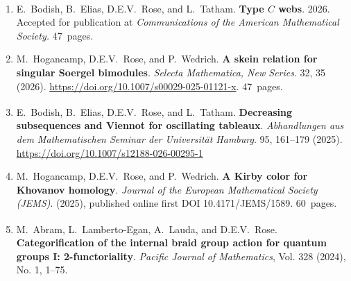 \documentclass[10pt]{article}
\begin{document}
\begin{enumerate}

\item 
E.~Bodish\textsuperscript{\textdagger}, B.~Elias, D.E.V.~Rose, and L.~Tatham\textsuperscript{\textdagger}.
{\bf Type $C$ webs}.
2026.
Accepted for publication at 
\emph{Communications of the American Mathematical Society.}
47~pages.

\item
M.~Hogancamp, D.E.V.~Rose, and P.~Wedrich.
{\bf A skein relation for singular Soergel bimodules}.
\emph{Selecta Mathematica, New Series}.
32, 35 (2026). 
\href{https://doi.org/10.1007/s00029-025-01121-x}{https://doi.org/10.1007/s00029-025-01121-x}.
47~pages.

\item
E.~Bodish\textsuperscript{\textdagger}, B.~Elias, D.E.V.~Rose, and L.~Tatham.
{\bf Decreasing subsequences and Viennot for oscillating tableaux}.
\emph{Abhandlungen aus dem Mathematischen Seminar der Universit\"{a}t Hamburg}.
95, 161–179 (2025).
\href{https://doi.org/10.1007/s12188-026-00295-1}
{https://doi.org/10.1007/s12188-026-00295-1}

\item 
M.~Hogancamp, D.E.V.~Rose, and P.~Wedrich.
{\bf A Kirby color for Khovanov homology}.
\emph{Journal of the European Mathematical Society (JEMS)}.
(2025), published online first DOI 10.4171/JEMS/1589.
60~pages.

\item 
M.~Abram\textsuperscript{\textdagger}, L.~Lamberto-Egan\textsuperscript{\textdagger}, 
A.~Lauda, and D.E.V.~Rose.
{\bf Categorification of the internal braid group action for quantum groups I: 2-functoriality}. 
\emph{Pacific Journal of Mathematics},
Vol. 328 (2024), No. 1, 1--75.


\end{enumerate}
\end{document}
